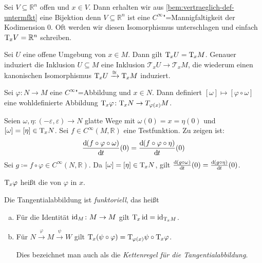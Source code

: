 \begin{bemerkung}[{name=[linearer Isomorphismus zum euklidischen Raum]}]
	Sei $V \subseteq \mathbb{R}^n$ offen und $x \in V$. 
	Dann erhalten wir aus \cref{bem:vertraeglich-def-untermfkt} eine Bijektion 
	denn $V \subseteq \mathbb{R}^n$ ist eine $C^\infty$"=Mannigfaltigkeit der Kodimension $0$. 
	Oft werden wir diesen Isomorphismus unterschlagen und einfach $\mathrm{T}\mkern-0.85mu_x V = \mathbb{R}^n$ schreiben.
\end{bemerkung}

\begin{bemerkung}[{name=[Tangential einer offenen Teilmenge]}]
	Sei $U$ eine offene Umgebung von $x \in M$. 
	Dann gilt $\mathrm{T}\mkern-0.85mu_x U = \mathrm{T}\mkern-0.85mu_x M$. 
	Genauer induziert die Inklusion $U \subseteq M$ eine Inklusion $\mathcal{T}_x U \to \mathcal{T}_x M$, die wiederum einen kanonischen Isomorphismus $\mathrm{T}\mkern-0.85mu_x U \xrightarrow{\cong} \mathrm{T}\mkern-0.85mu_x M$ induziert.
\end{bemerkung}

\begin{lemma}[{name=[Wohldefiniertheit der Tangentialabbildung]}]
	Sei $\varphi \colon N \to M$ eine $C^\infty$"=Abbildung und $x \in N$. 
	Dann definiert $[\omega] \mapsto [\varphi \circ \omega]$ eine wohldefinierte Abbildung $\mathrm{T}\mkern-0.85mu_x \varphi \colon \mathrm{T}\mkern-0.85mu_x N \to T_{\varphi(x)} M$.
\end{lemma}
\begin{beweis}
	Seien $\omega, \eta \colon (-\varepsilon, \varepsilon) \to N$ glatte Wege mit $\omega(0)=x= \eta(0)$ und $[\omega]= [\eta]\in \mathrm{T}\mkern-0.85mu_x N$. 
	Sei $f \in C^\infty(M,\mathbb{R})$ eine Testfunktion. Zu zeigen ist: 
	\[
		\frac{\mathrm{d}\mkern-1.0mu (f \circ \varphi \circ \omega)}{\mathrm{d}\mkern-1.0mu t}  (0) = \frac{\mathrm{d}\mkern-1.0mu (f \circ \varphi \circ \eta)}{\mathrm{d}\mkern-1.0mu t} (0)
	\]
	Sei $g \coloneqq f \circ \varphi \in C^\infty(N,\mathbb{R})$. 
	Da $[\omega]= [\eta] \in \mathrm{T}\mkern-0.85mu_x N$, gilt 
	\(
		\frac{\mathrm{d}\mkern-1.0mu (g \circ \omega)}{\mathrm{d}\mkern-1.0mu t} (0) = \frac{\mathrm{d}\mkern-1.0mu (g \circ \eta)}{\mathrm{d}\mkern-1.0mu t} (0)
	\).
\end{beweis}

\begin{definition}[{name=[Tangentialabbildung]}]
	$\mathrm{T}\mkern-0.85mu_x \varphi$ heißt die  von $\varphi$ in $x$.
\end{definition}

Die Tangentialabbildung ist \emph{funktoriell}, das heißt
\begin{enumerate}[a)]
	\item Für die Identität $\operatorname{id}_M \colon M \to M$ gilt $\mathrm{T}\mkern-0.85mu_x \operatorname{id} = \operatorname{id}_{\mathrm{T}\mkern-0.85mu_x M}$.
	\item Für $N \xrightarrow{\varphi} M \xrightarrow{\psi} W$ gilt $\mathrm{T}\mkern-0.85mu_x(\psi \circ \varphi) = \mathrm{T}\mkern-0.85mu_{\varphi(x)} \psi \circ \mathrm{T}\mkern-0.85mu_x \varphi$.
	
	Dies bezeichnet man auch als die \emph{Kettenregel für die Tangentialabbildung}.
\end{enumerate}

